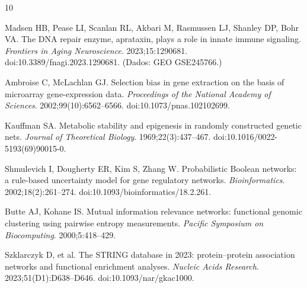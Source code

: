 \documentclass[10pt,letterpaper]{article}
\begin{document}

\nolinenumbers

\begin{thebibliography}{10}

Madsen HB, Pease LI, Scanlan RL, Akbari M, Rasmussen LJ, Shanley DP, Bohr VA.
The DNA repair enzyme, aprataxin, plays a role in innate immune signaling.
\emph{Frontiers in Aging Neuroscience}. 2023;15:1290681.
doi:10.3389/fnagi.2023.1290681. (Dados: GEO GSE245766.)

Ambroise C, McLachlan GJ.
Selection bias in gene extraction on the basis of microarray gene-expression
data. \emph{Proceedings of the National Academy of Sciences}.
2002;99(10):6562--6566. doi:10.1073/pnas.102102699.

Kauffman SA.
Metabolic stability and epigenesis in randomly constructed genetic nets.
\emph{Journal of Theoretical Biology}. 1969;22(3):437--467.
doi:10.1016/0022-5193(69)90015-0.

Shmulevich I, Dougherty ER, Kim S, Zhang W.
Probabilistic Boolean networks: a rule-based uncertainty model for gene
regulatory networks. \emph{Bioinformatics}. 2002;18(2):261--274.
doi:10.1093/bioinformatics/18.2.261.

Butte AJ, Kohane IS.
Mutual information relevance networks: functional genomic clustering using
pairwise entropy measurements. \emph{Pacific Symposium on Biocomputing}.
2000;5:418--429.

Szklarczyk D, et al.
The STRING database in 2023: protein--protein association networks and
functional enrichment analyses. \emph{Nucleic Acids Research}.
2023;51(D1):D638--D646. doi:10.1093/nar/gkac1000.
\end{thebibliography}
\end{document}
